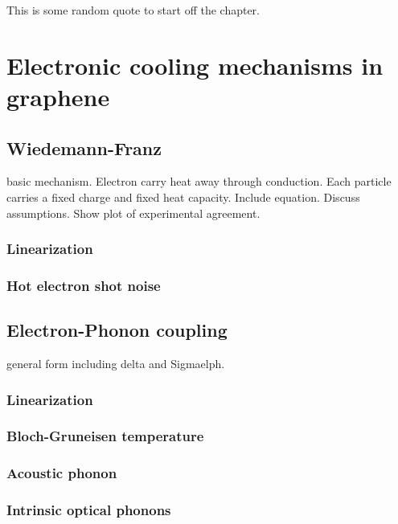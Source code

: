 \begin{savequote}[75mm]
This is some random quote to start off the chapter.
\end{savequote}

\chapter{Electronic cooling mechanisms in graphene}
\label{ch:electronic_cooling_mechanisms_in_graphene}

\section{Wiedemann-Franz}
basic mechanism. Electron carry heat away through conduction. Each particle carries a fixed charge and fixed heat capacity. Include equation. Discuss assumptions. Show plot of experimental agreement.

\subsection{Linearization}

\subsection{Hot electron shot noise}

\section{Electron-Phonon coupling}
general form including delta and Sigmaelph.

\subsection{Linearization}

\subsection{Bloch-Gruneisen temperature}

\subsection{Acoustic phonon}

\subsection{Intrinsic optical phonons}

